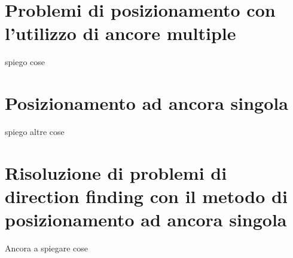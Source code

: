 \section{Problemi di posizionamento con l'utilizzo di ancore multiple}
	spiego cose
	
\section{Posizionamento ad ancora singola}
	spiego altre cose
	
\section{Risoluzione di problemi di direction finding con il metodo di posizionamento ad ancora singola}
	Ancora a spiegare cose